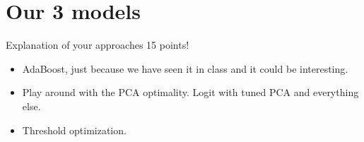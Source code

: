 \documentclass{article}
\begin{document}
\section{Our 3 models} \label{sec:1.3}

Explanation of your approaches 15 points!
\begin{itemize}
    \item AdaBoost, just because we have seen it in class and it could be interesting.
    \item Play around with the PCA optimality. Logit with tuned PCA and everything else.
    \item Threshold optimization. 
\end{itemize}
\end{document}
